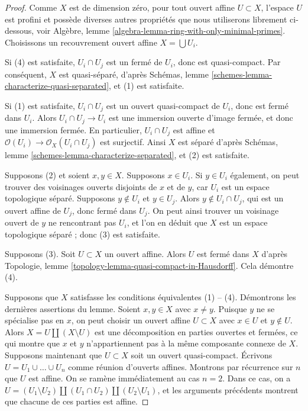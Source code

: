 \begin{proof}
Comme $X$ est de dimension zéro, pour tout ouvert affine
$U \subset X$, l'espace $U$ est profini et possède
diverses autres propriétés que nous utiliserons librement ci-dessous, voir
Algèbre, lemme \ref{algebra-lemma-ring-with-only-minimal-primes}.
Choisissons un recouvrement ouvert affine $X = \bigcup U_i$.

\medskip\noindent
Si (4) est satisfaite, $U_i \cap U_j$ est un fermé de
$U_i$, donc est quasi-compact. Par conséquent, $X$ est quasi-séparé,
d'après Schémas, lemme \ref{schemes-lemma-characterize-quasi-separated},
et (1) est satisfaite.

\medskip\noindent
Si (1) est satisfaite, $U_i \cap U_j$ est un ouvert quasi-compact
de $U_i$, donc est fermé dans $U_i$. Alors $U_i \cap U_j \to U_i$
est une immersion ouverte d'image fermée, et donc une
immersion fermée. En particulier, $U_i \cap U_j$ est affine
et $\mathcal{O}(U_i) \to \mathcal{O}_X(U_i \cap U_j)$ est surjectif.
Ainsi $X$ est séparé
d'après Schémas, lemme \ref{schemes-lemma-characterize-separated},
et (2) est satisfaite.

\medskip\noindent
Supposons (2) et soient $x, y \in X$. Supposons $x \in U_i$. Si $y \in U_i$
également, on peut trouver des voisinages ouverts disjoints de $x$ et de $y$,
car $U_i$ est un espace topologique séparé. Supposons $y \not \in U_i$ et $y \in U_j$.
Alors $y \not \in U_i \cap U_j$, qui est un ouvert affine de $U_j$,
donc fermé dans $U_j$. On peut ainsi trouver un voisinage ouvert
de $y$ ne rencontrant pas $U_i$, et l'on en déduit que $X$ est un espace topologique séparé ;
donc (3) est satisfaite.

\medskip\noindent
Supposons (3). Soit $U \subset X$ un ouvert affine.
Alors $U$ est fermé dans $X$ d'après Topologie, lemme
\ref{topology-lemma-quasi-compact-in-Hausdorff}.
Cela démontre (4).

\medskip\noindent
Supposons que $X$ satisfasse les conditions équivalentes (1) -- (4).
Démontrons les dernières assertions du lemme. Soient $x, y \in X$
avec $x \not = y$. Puisque $y$ ne se spécialise pas en $x$, on peut
choisir un ouvert affine $U \subset X$ avec $x \in U$ et $y \not \in U$.
Alors $X = U \amalg (X \setminus U)$ est une décomposition
en parties ouvertes et fermées, ce qui montre que $x$ et $y$ n'appartiennent pas
à la même composante connexe de $X$. Supposons maintenant que $U \subset X$
soit un ouvert quasi-compact. Écrivons $U = U_1 \cup \ldots \cup U_n$ comme réunion
d'ouverts affines. Montrons par récurrence sur $n$ que $U$ est affine.
On se ramène immédiatement au cas $n = 2$. Dans ce cas, on a
$U = (U_1 \setminus U_2) \amalg (U_1 \cap U_2) \amalg (U_2 \setminus U_1)$,
et les arguments précédents montrent que chacune de ces parties est affine.
\end{proof}

